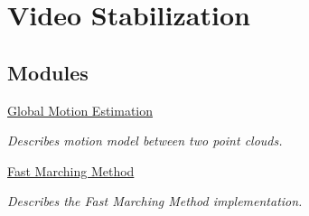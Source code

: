 \hypertarget{group__videostab}{}\section{Video Stabilization}
\label{group__videostab}
\subsection*{Modules}
\begin{DoxyCompactItemize}
\item 
\hyperlink{group__videostab__motion}{Global Motion Estimation}
\begin{DoxyCompactList}\small\item\em Describes motion model between two point clouds. \end{DoxyCompactList}\item 
\hyperlink{group__videostab__marching}{Fast Marching Method}
\begin{DoxyCompactList}\small\item\em Describes the Fast Marching Method implementation. \end{DoxyCompactList}\end{DoxyCompactItemize}
